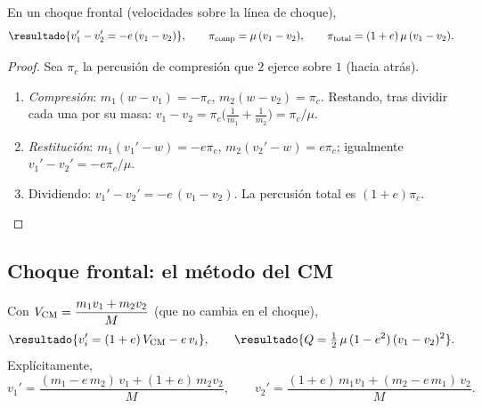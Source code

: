\begin{teorema}
\label{teo:huygens}
En un choque frontal (velocidades sobre la línea de choque),
\begin{equation}
  \resultado{v_{1}'-v_{2}'=-e\,(v_{1}-v_{2})} ,
  \qquad
  \pi_{\mathrm{comp}}=\mu\,(v_{1}-v_{2}),\qquad
  \pi_{\mathrm{total}}=(1+e)\,\mu\,(v_{1}-v_{2}) .
  \label{eq:huygens}
\end{equation}
\end{teorema}

\begin{proof}
Sea $\pi_{c}$ la percusión de compresión que $2$ ejerce sobre $1$ (hacia atrás).
\begin{enumerate}
  \item \emph{Compresión}: $m_{1}(w-v_{1})=-\pi_{c}$, $m_{2}(w-v_{2})=\pi_{c}$. Restando,
        tras dividir cada una por su masa: $v_{1}-v_{2}=\pi_{c}\bigl(\frac1{m_{1}}+\frac1{m_{2}}\bigr)=\pi_{c}/\mu$.
  \item \emph{Restitución}: $m_{1}(v_{1}'-w)=-e\pi_{c}$, $m_{2}(v_{2}'-w)=e\pi_{c}$; igualmente
        $v_{1}'-v_{2}'=-e\pi_{c}/\mu$.
  \item Dividiendo: $v_{1}'-v_{2}'=-e\,(v_{1}-v_{2})$. La percusión total es $(1+e)\pi_{c}$.\qedhere
\end{enumerate}
\end{proof}

\subsection{Choque frontal: el método del CM}

\begin{teorema}
\label{teo:frontal}
Con $V_{\mathrm{CM}}=\dfrac{m_{1}v_{1}+m_{2}v_{2}}{M}$ (que no cambia en el choque),
\begin{equation}
  \resultado{v_{i}'=(1+e)\,V\cm-e\,v_{i}},\qquad
  \resultado{Q=\tfrac12\,\mu\,(1-e^{2})\,(v_{1}-v_{2})^{2}} .
  \label{eq:frontal}
\end{equation}
Explícitamente,
\begin{equation}
  v_{1}'=\frac{(m_{1}-e\,m_{2})\,v_{1}+(1+e)\,m_{2}v_{2}}{M},\qquad
  v_{2}'=\frac{(1+e)\,m_{1}v_{1}+(m_{2}-e\,m_{1})\,v_{2}}{M}.
  \label{eq:frontal-explicito}
\end{equation}
\end{teorema}

